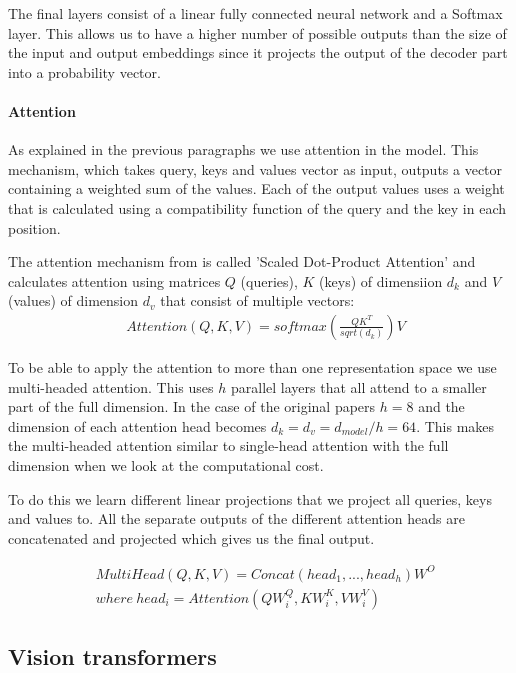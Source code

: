 The final layers consist of a linear fully connected neural network and a Softmax layer. This allows us to have a higher number of possible outputs than the size of the input and output embeddings since it projects the output of the decoder part into a probability vector.

\paragraph{Attention}

As explained in the previous paragraphs we use attention in the model. This mechanism, which takes query, keys and values vector as input, outputs a vector containing a weighted sum of the values. Each of the output values uses a weight that is calculated using a compatibility  function of the query and the key in each position.

The attention mechanism from \cite{vaswani_attention_2017} is called 'Scaled Dot-Product Attention' and calculates attention using matrices $Q$ (queries), $K$ (keys) of dimensiion $d_k$ and $V$ (values) of dimension $d_v$ that consist of multiple vectors:
\begin{align*}
&Attention(Q, K, V) = softmax(\frac{QK^T} {sqrt(d_k)})V
\end{align*}

To be able to apply the attention to more than one representation space we use multi-headed attention. This uses $h$ parallel layers that all attend to a smaller part of the full dimension. In the case of the original papers $h = 8$ and the dimension of each attention head becomes $d_k = d_v = d_{model} / h = 64$. This makes the multi-headed attention similar to single-head attention with the full dimension when we look at the computational cost.

To do this we learn different linear projections that we project all queries, keys and values to.  All the separate outputs of the different attention heads are concatenated and projected which gives us the final output.

\begin{align*}
&MultiHead(Q, K, V) = Concat(head_1, ..., head_h)W^O\\
& where\ head_i = Attention(QW_i^Q, KW_i^K, VW_i^V)
\end{align*}


\subsection{Vision transformers}

